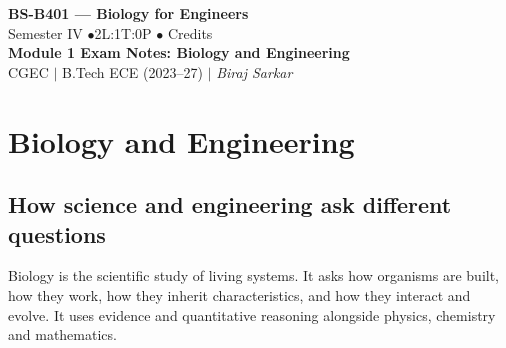 \documentclass[12pt,a4paper]{article}
\begin{document}
\begin{center}
  {\LARGE\bfseries\color{myred} BS-B401 --- Biology for Engineers}\\[5pt]
  {\normalsize\color{mydark} Semester IV \quad$\bullet$\quad 2L:1T:0P \quad$\bullet$ Credits}\\[3pt]
  {\normalsize\color{myteal}\textbf{Module 1 Exam Notes: Biology and Engineering}}\\[3pt]
  {\small\color{mydark} CGEC \;$|$\; B.Tech ECE (2023--27) \;$|$\; \textit{Biraj Sarkar}}
\end{center}
\vspace{2pt}
\noindent{\color{myred}\rule{\linewidth}{1.5pt}}
\vspace{2pt}

\hypersetup{linkcolor=mydark}
\tableofcontents
\hypersetup{linkcolor=myteal}
\newpage

\section{Biology and Engineering}
\subsection{How science and engineering ask different questions}
\begin{tcolorbox}[defbox, title={Biology}]
Biology is the scientific study of living systems. It asks how organisms are built, how they work, how they inherit characteristics, and how they interact and evolve. It uses evidence and quantitative reasoning alongside physics, chemistry and mathematics.
\end{tcolorbox}
\end{document}
